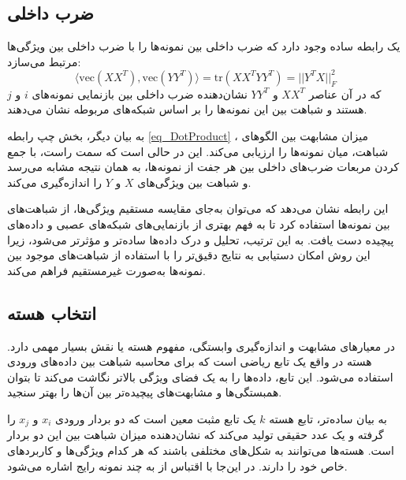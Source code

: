 \subsection{
	ضرب داخلی%
}
یک رابطه ساده وجود دارد که ضرب داخلی بین نمونه‌ها را با ضرب داخلی بین ویژگی‌ها مرتبط می‌سازد:
\begin{equation}
	\langle \text{vec}(XX^T), \text{vec}(YY^T) \rangle = \text{tr}(XX^TYY^T) = ||Y^TX||_F^2
	\label{eq_DotProduct}
\end{equation}
که در آن عناصر \(XX^T\) و \(YY^T\) نشان‌دهنده ضرب داخلی بین بازنمایی نمونه‌های \(i\) و \(j\) هستند و شباهت بین این نمونه‌ها را بر اساس شبکه‌های مربوطه نشان می‌دهند. 

به بیان دیگر، بخش چپ رابطه
\eqref{eq_DotProduct}%
، میزان مشابهت بین الگوهای شباهت، میان نمونه‌ها را ارزیابی می‌کند. این در حالی است که سمت راست، با جمع کردن مربعات ضرب‌های داخلی بین هر جفت از نمونه‌ها، به همان نتیجه مشابه می‌رسد و شباهت بین ویژگی‌های \(X\) و \(Y\) را اندازه‌گیری می‌کند.

این رابطه نشان می‌دهد که می‌توان به‌جای مقایسه مستقیم ویژگی‌ها، از شباهت‌های بین نمونه‌ها استفاده کرد تا به فهم بهتری از بازنمایی‌های شبکه‌های عصبی و داده‌های پیچیده دست یافت. به این ترتیب، تحلیل و درک داده‌ها ساده‌تر و مؤثرتر می‌شود، زیرا این روش امکان دستیابی به نتایج دقیق‌تر را با استفاده از شباهت‌های موجود بین نمونه‌ها به‌صورت غیرمستقیم فراهم می‌کند.




\subsection{
	انتخاب هسته%
}\label{sec_kernel_selection}
در معیارهای مشابهت و اندازه‌گیری وابستگی، مفهوم هسته یا
نقش بسیار مهمی دارد. هسته در واقع یک تابع ریاضی است که برای محاسبه شباهت بین داده‌های ورودی استفاده می‌شود. این تابع، داده‌ها را به یک فضای ویژگی بالاتر نگاشت می‌کند تا بتوان همبستگی‌ها و مشابهت‌های پیچیده‌تر بین آن‌ها را بهتر سنجید.



به بیان ساده‌تر، تابع هسته \( k \) یک تابع مثبت معین است که دو بردار ورودی \( x_i \) و \( x_j \) را گرفته و یک عدد حقیقی تولید می‌کند که نشان‌دهنده میزان شباهت بین این دو بردار است. هسته‌ها می‌توانند به شکل‌های مختلفی باشند که هر کدام ویژگی‌ها و کاربردهای خاص خود را دارند. در این‌جا با اقتباس از
\cite{kornblith2019similarity}
به چند نمونه رایج اشاره می‌شود.

